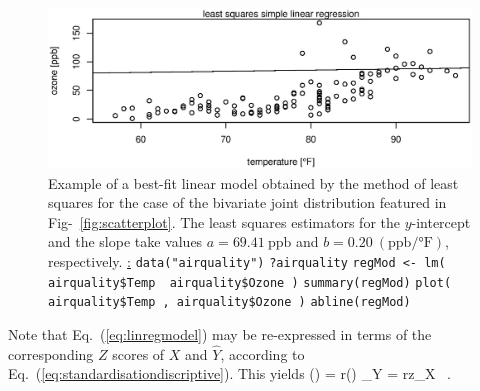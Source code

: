%
\begin{figure}[!htb]
\begin{center}
\includegraphics[scale=0.8]{linReg.eps}
\end{center}
\caption{Example of a best-fit linear model obtained by the method
of least squares for the case of the bivariate joint distribution
featured in Fig-~\ref{fig:scatterplot}. The least squares
estimators for the $y$-intercept and the slope take values
$a = 69.41~\text{ppb}$ and
$b = 0.20~(\text{ppb}/\text{°F})$, respectively. \newline
\underline{\R:} \newline
\texttt{data("airquality")} \newline
\texttt{?airquality} \newline
\texttt{regMod <- lm( airquality\$Temp~\texttildelow~airquality\$Ozone )} \newline
\texttt{summary(regMod)} \newline
\texttt{plot( airquality\$Temp , airquality\$Ozone )} \newline
\texttt{abline(regMod)}}
\end{figure}
%

\medskip
\noindent
Note that Eq.~(\ref{eq:linregmodel}) may be re-expressed in terms 
of the corresponding $Z$ scores of $X$ and $\hat{Y}$, according to
Eq.~(\ref{eq:standardisationdiscriptive}). This yields
%
\be
\left(\right)
= r\left(\right)
\qquad\Leftrightarrow\qquad
{}_{Y} = rz_{X} \ .
\ee
%

